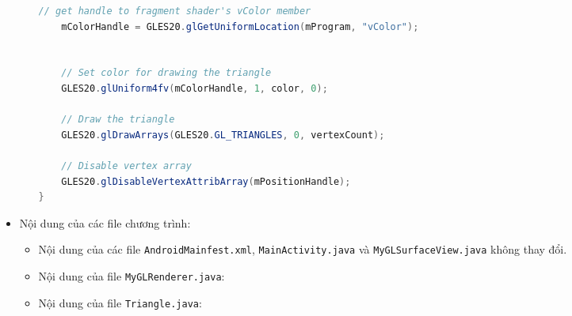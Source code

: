 \documentclass[13pt,a4paper]{extreport}
\begin{document}
\begin{itemize}
\begin{itemize}
\begin{lstlisting}[language=Java]
    // get handle to fragment shader's vColor member
    mColorHandle = GLES20.glGetUniformLocation(mProgram, "vColor");


    // Set color for drawing the triangle
    GLES20.glUniform4fv(mColorHandle, 1, color, 0);

    // Draw the triangle
    GLES20.glDrawArrays(GLES20.GL_TRIANGLES, 0, vertexCount);

    // Disable vertex array
    GLES20.glDisableVertexAttribArray(mPositionHandle);
}					
					\end{lstlisting}							
			\end{itemize}
		
		\item Nội dung của các file chương trình:
			\begin{itemize}
				\item Nội dung của các file \verb|AndroidMainfest.xml|, \verb|MainActivity.java| và \verb|MyGLSurfaceView.java| không thay đổi.
				\item Nội dung của file \verb|MyGLRenderer.java|:
										
				
				\item Nội dung của file \verb|Triangle.java|:
					
			\end{itemize}


\end{itemize}
\end{document}
